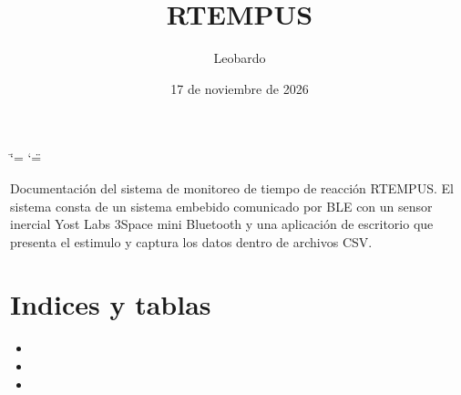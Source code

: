 \documentclass[letterpaper,10pt,spanish]{sphinxmanual}
\title{RTEMPUS}
\date{17 de noviembre de 2026}
\author{Leobardo}
\begin{document}
\ifdefined\shorthandoff
  \ifnum\catcode`\=\string=\active\shorthandoff{=}\fi
  \ifnum\catcode`\"=\active{}\fi
\fi

\pagestyle{empty}
\sphinxmaketitle
\pagestyle{plain}
\sphinxtableofcontents
\pagestyle{normal}
\label{\detokenize{index::doc}}


\sphinxAtStartPar
Documentación del sistema de monitoreo de tiempo de reacción RTEMPUS.
El sistema consta de un sistema embebido comunicado por BLE con un sensor inercial
Yost Labs 3\sphinxhyphen{}Space mini Bluetooth y una aplicación de escritorio que presenta el estimulo
y captura los datos dentro de archivos CSV.


\chapter{Indices y tablas}
\label{\detokenize{index:indices-y-tablas}}\begin{itemize}
\item {} 
\sphinxAtStartPar
{}

\item {} 
\sphinxAtStartPar
{}

\item {} 
\sphinxAtStartPar
{}

\end{itemize}



\renewcommand{\indexname}{Índice}
\printindex
\end{document}
